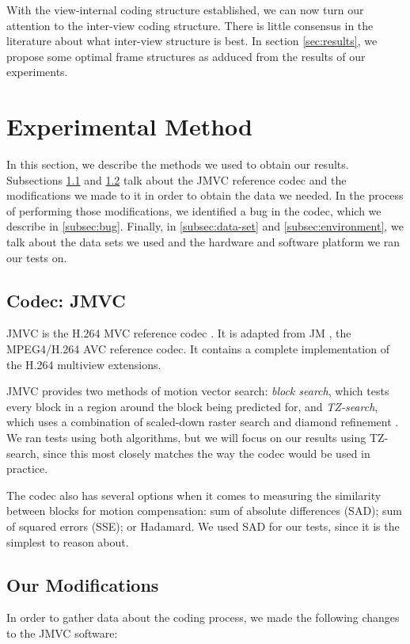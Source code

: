 \documentclass{sig-alternate-05-2015}
\begin{document}
With the view-internal coding structure established, we can now turn our
attention to the inter-view coding structure. There is little consensus in
the literature about what inter-view structure is best. In section
\ref{sec:results}, we propose some optimal frame structures as adduced from the
results of our experiments.

\section{Experimental Method} %
\label{sec:method} %
In this section, we describe the methods we used to obtain our results.
Subsections \ref{subsec:jmvc} and \ref{subsec:modifications} talk about the JMVC
reference codec and the modifications we made to it in order to obtain the data
we needed. In the process of performing those modifications, we identified a bug
in the codec, which we describe in \ref{subsec:bug}. Finally, in
\ref{subsec:data-set} and \ref{subsec:environment}, we talk about the data sets
we used and the hardware and software platform we ran our tests on.

\subsection{Codec: JMVC}
\label{subsec:jmvc}
JMVC is the H.264 MVC reference codec \cite{schwarz:jmvc}. It is adapted from
JM \cite{suehring:jm}, the MPEG4/H.264 AVC reference codec. It contains a
complete implementation of the H.264 multiview extensions.

JMVC provides two methods of motion vector search: {\it block search}, which
tests every block in a region around the block being predicted for, and {\it
TZ-search}, which uses a combination of scaled-down raster search and diamond
refinement \cite{purnachand:improvements}. We ran tests using both algorithms,
but we will focus on our results using TZ-search, since this most closely
matches the way the codec would be used in practice.

The codec also has several options when it comes to measuring the similarity
between blocks for motion compensation: sum of absolute differences (SAD); sum
of squared errors (SSE); or Hadamard. We used SAD for our tests, since it is
the simplest to reason about.

\subsection{Our Modifications}
\label{subsec:modifications}
In order to gather data about the coding process, we made the following changes
to the JMVC software:
\end{document}
